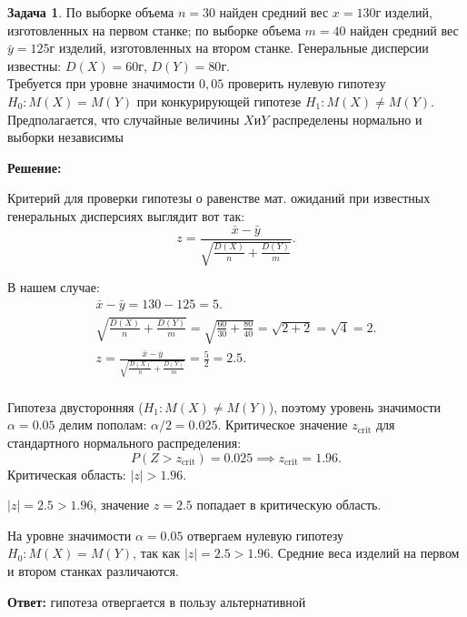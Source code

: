 \documentclass[a4paper,11pt]{article}
\newenvironment{shdd}{\begin{mdframed}[backgroundcolor=shadecolor]}{\end{mdframed}}
\theoremstyle{definition}
\newtheorem{problem}{Задача}\setlength{\parindent}{0pt}
\newenvironment{solution}
{\begin{shdd}
     \textbf{Решение:}\par\setlength{\parindent}{0pt}}
     {
\end{shdd}}
\newenvironment{answer}
{\par\noindent\textbf{Ответ:}}
{\par}
\begin{document}
    \vspace{10pt}
    \begin{problem}
        По выборке объема \(n = 30\) найден средний вес \(x = 130\)г изделий, изготовленных на
        первом станке; по выборке объема \(m = 40\) найден средний вес \(\bar{y} = 125\)г изделий,
        изготовленных на втором станке.
        Генеральные дисперсии известны: \(D(X) = 60\)г, \(D(Y) = 80\)г.
        \\
        
        Требуется при уровне значимости \(0,05\) проверить нулевую гипотезу \(H_0 : M(X) = M(Y)\)
        при конкурирующей гипотезе \(H_1 : M(X) \neq M(Y)\).
        Предполагается, что случайные величины \(X\)и\(Y\) распределены нормально и выборки независимы

        \begin{solution}
            Критерий для проверки гипотезы о равенстве
            мат. ожиданий при известных генеральных дисперсиях выглядит вот так:
            \[
                z = \frac{\bar{x} - \bar{y}}{\sqrt{\frac{D(X)}{n} + \frac{D(Y)}{m}}}.
            \]

            В нашем случае:
            \begin{gather*}
                \bar{x} - \bar{y} = 130 - 125 = 5.\\
                \sqrt{\frac{D(X)}{n} + \frac{D(Y)}{m}} = \sqrt{\frac{60}{30} + \frac{80}{40}} = \sqrt{2 + 2} = \sqrt{4} = 2.\\
                z = \frac{\bar{x} - \bar{y}}{\sqrt{\frac{D(X)}{n} + \frac{D(Y)}{m}}} = \frac{5}{2} = 2.5.\\
            \end{gather*}

            Гипотеза двусторонняя (\(H_1: M(X) \neq M(Y)\)), поэтому уровень значимости \(\alpha = 0.05\) делим пополам: \(\alpha/2 = 0.025\).
            Критическое значение \(z_{\text{crit}}\) для стандартного нормального распределения:
            \[
                P(Z > z_{\text{crit}}) = 0.025 \implies z_{\text{crit}} = 1.96.
            \]
            Критическая область: \(|z| > 1.96\).

            \(|z| = 2.5 > 1.96\), значение \(z = 2.5\) попадает в критическую область.

            На уровне значимости \(\alpha = 0.05\) отвергаем нулевую гипотезу \(H_0: M(X) = M(Y)\), так как \(|z| = 2.5 > 1.96\).
            Средние веса изделий на первом и втором станках различаются.
        \end{solution}

        \begin{answer}
            гипотеза отвергается в пользу альтернативной
        \end{answer}

    \end{problem}
\end{document}
